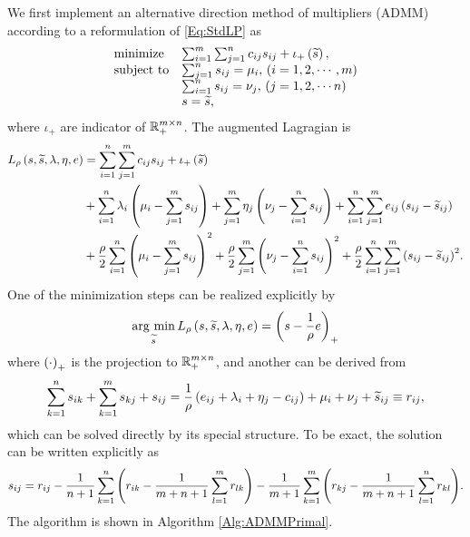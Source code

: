 \documentclass[english]{pkupaper}
\begin{document}
We first implement an alternative direction method of multipliers (ADMM) according to a reformulation of \eqref{Eq:StdLP} as
\begin{equation} \label{Eq:ADMMPrimal}
\begin{array}{ll}
\mathrel{\text{{minimize}}} & \sum_{ {i} = {1} }^{m}{\sum_{ {j} = {1} }^{n}{ c_{ i j } s_{ i j } }} + \iota_+ \left( \widetilde{s} \right), \\
\mathrel{\text{{subject to}}} & \sum_{ {j} = {1} }^{n}{s_{ i j }} = \mu_i, \mathbin{}\left(  i = 1, 2, \cdots, m  \right) \\
& \sum_{ {i} = {1} }^{n}{s_{ i j }} = \nu_j, \mathbin{}\left(  j = 1, 2, \cdots n  \right) \\
& s = \widetilde{s},
\end{array}
\end{equation}
where $\iota_+$ are indicator of $ \mathbb{R}^{ m \times n }_+ $. The augmented Lagragian is
\begin{equation}
\begin{aligned}
L_{\rho} \left(  s, \widetilde{s}, \lambda, \eta, e  \right) &= \sum_{ {i} = {1} }^{n}{\sum_{ {j} = {1} }^{m}{ c_{ i j } s_{ i j } }} + \iota_+ \left( \widetilde{s} \right) \\
&+ \sum_{ {i} = {1} }^{n}{ \lambda_i \left(  \mu_i - \sum_{ {j} = {1} }^{m}{s_{ i j }}  \right) } + \sum_{ {j} = {1} }^{m}{ \eta_j \left(  \nu_j - \sum_{ {i} = {1} }^{n}{s_{ i j }}  \right) } + \sum_{ {i} = {1} }^{n}{\sum_{ {j} = {1} }^{m}{ e_{ i j } \left(  s_{ i j } - \widetilde{s}_{ i j }  \right) }} \\
&+ \frac{\rho}{2} \sum_{ {i} = {1} }^{n}{\left(  \mu_i - \sum_{ {j} = {1} }^{m}{s_{ i j }}  \right)^2} + \frac{\rho}{2} \sum_{ {j} = {1} }^{m}{\left(  \nu_j - \sum_{ {i} = {1} }^{n}{s_{ i j }}  \right)^2} + \frac{\rho}{2} \sum_{ {i} = {1} }^{n}{\sum_{ {j} = {1} }^{m}{\left(  s_{ i j } - \widetilde{s}_{ i j }  \right)^2}}. \\
\end{aligned}
\end{equation}
One of the minimization steps can be realized explicitly by
\begin{equation} \label{Eq:ProjStep}
\operatorname*{\arg\,\min}_{\widetilde{s}} L_{\rho} \left(  s, \widetilde{s}, \lambda, \eta, e  \right) = \left(  s - \frac{1}{\rho} e  \right)_+
\end{equation}
where $\left( \cdot \right)_+$ is the projection to $ \mathbb{R}^{ m \times n }_+ $, and another can be derived from
\begin{gather} \label{Eq:LinSys}
\sum_{ {k} = {1} }^{n}{s_{ i k }} + \sum_{ {k} = {1} }^{m}{s_{ k j }} + s_{ i j } = \frac{1}{\rho} \left(  e_{ i j } + \lambda_i + \eta_j - c_{ i j }  \right) + \mu_i + \nu_j + \widetilde{s}_{ i j } \equiv r_{ i j },
\end{gather}
which can be solved directly by its special structure. To be exact, the solution can be written explicitly as
\begin{equation}
s_{ i j } = r_{ i j } - \frac{1}{ n + 1 } \sum_{ {k} = {1} }^{n}{\left(  r_{ i k } - \frac{1}{ m + n + 1 } \sum_{ {l} = {1} }^{m}{r_{ l k }}  \right)} - \frac{1}{ m + 1 } \sum_{ {k} = {1} }^{m}{\left(  r_{ k j } - \frac{1}{ m + n + 1 } \sum_{ {l} = {1} }^{n}{r_{ k l }}  \right)}.
\end{equation}
The algorithm is shown in Algorithm \ref{Alg:ADMMPrimal}.
\end{document}
